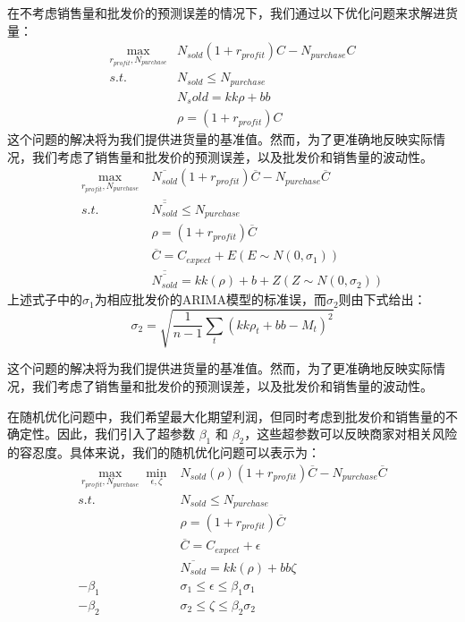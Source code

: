 \documentclass[withoutpreface,bwprint]{cumcmthesis} %
\begin{document}
在不考虑销售量和批发价的预测误差的情况下，我们通过以下优化问题来求解进货量：
 \begin{align}
    \max_{r_{profit},N_{purchase}}&N_{sold}(1+r_{profit})C-N_{purchase}C\\
    s.t.& N_{sold} \leq N_{purchase}\\
        &N_sold=kk\rho+bb\\%
        & \rho=(1+r_{profit})C  
\end{align}
这个问题的解决将为我们提供进货量的基准值。然而，为了更准确地反映实际情况，我们考虑了销售量和批发价的预测误差，以及批发价和销售量的波动性。
\begin{align}
    \max_{r_{profit},N_{purchase}}\ &\overline{N_{sold}}(1+r_{profit})\overline{C}-N_{purchase}\overline{C}\\
    s.t.& \overline{\overline{N_{sold}}} \leq N_{purchase}\\
    &\rho=(1+r_{profit})\overline{C}\\
    &\overline{C}=C_{expect}+E (E\sim N(0,\sigma_1))\\
    &\overline{\overline{N_{sold}}}=kk(\rho)+b+Z (Z \sim N(0,\sigma_2))
\end{align}
上述式子中的$\sigma_1$为相应批发价的ARIMA模型的标准误，而$\sigma_2$则由下式给出：
\begin{equation*}
    \sigma_2=\sqrt{\frac{1}{n-1}\sum_t(kk\rho_t+bb-M_t)^2}
\end{equation*}

这个问题的解决将为我们提供进货量的基准值。然而，为了更准确地反映实际情况，我们考虑了销售量和批发价的预测误差，以及批发价和销售量的波动性。

在随机优化问题中，我们希望最大化期望利润，但同时考虑到批发价和销售量的不确定性。因此，我们引入了超参数 $\beta_1$ 和 $\beta_2$，这些超参数可以反映商家对相关风险的容忍度。具体来说，我们的随机优化问题可以表示为：
\begin{align}
    \max_{r_{profit},N_{purchase}}\min_{\epsilon,\zeta}&N_{sold}(\rho )(1+r_{profit})\overline{C}-N_{purchase}\overline{C}\\
    s.t.& N_{sold} \leq N_{purchase}\\
    &\rho=(1+r_{profit})\overline{C}\\
    &\overline{C}=C_{expect}+\epsilon\\
    &\overline{N_{sold}}=kk(\rho)+bb\zeta\\
    -\beta_1&\sigma_1 \leq \epsilon \leq \beta_1\sigma_1\\
    -\beta_2&\sigma_2 \leq \zeta\leq \beta_2\sigma_2
\end{align}
\end{document}
